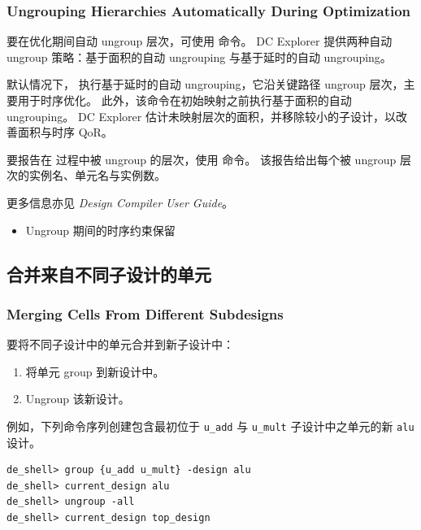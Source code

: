 \subsubsection*{Ungrouping Hierarchies Automatically During Optimization}

要在优化期间自动 ungroup 层次，可使用  命令。
DC Explorer 提供两种自动 ungroup 策略：基于面积的自动 ungrouping 与基于延时的自动 ungrouping。

默认情况下， 执行基于延时的自动 ungrouping，它沿关键路径 ungroup 层次，主要用于时序优化。
此外，该命令在初始映射之前执行基于面积的自动 ungrouping。
DC Explorer 估计未映射层次的面积，并移除较小的子设计，以改善面积与时序 QoR。

要报告在  过程中被 ungroup 的层次，使用  命令。
该报告给出每个被 ungroup 层次的实例名、单元名与实例数。

更多信息亦见 \textit{Design Compiler User Guide}。

\begin{seeAlsoBox}
\begin{itemize}
  \item Ungroup 期间的时序约束保留
\end{itemize}
\end{seeAlsoBox}

\subsection{合并来自不同子设计的单元}
\subsubsection*{Merging Cells From Different Subdesigns}

要将不同子设计中的单元合并到新子设计中：
\begin{enumerate}
  \item 将单元 group 到新设计中。
  \item Ungroup 该新设计。
\end{enumerate}

例如，下列命令序列创建包含最初位于 \texttt{u\_add} 与 \texttt{u\_mult} 子设计中之单元的新 \texttt{alu} 设计。
\begin{lstlisting}
de_shell> group {u_add u_mult} -design alu
de_shell> current_design alu
de_shell> ungroup -all
de_shell> current_design top_design
\end{lstlisting}

